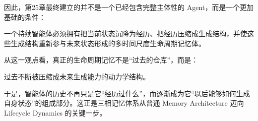 因此，第25章最终建立的并不是一个已经包含完整主体性的 Agent，而是一个更加基础的条件：

\begin{statementbox}
一个持续智能体必须拥有把当前状态沉降为经历、把经历压缩成生成结构，并使这些生成结构重新参与未来状态形成的多时间尺度生命周期记忆体。
\end{statementbox}

从这一观点看，真正的生命周期记忆不是“过去的仓库”，而是：

\begin{statementbox}
过去不断被压缩成未来生成能力的动力学结构。
\end{statementbox}

于是，智能体的历史不再只是它“经历过什么”，而逐渐成为它“以后能够如何生成自身状态”的组成部分。这正是三相记忆体系从普通 Memory Architecture 迈向 Lifecycle Dynamics 的关键一步。
